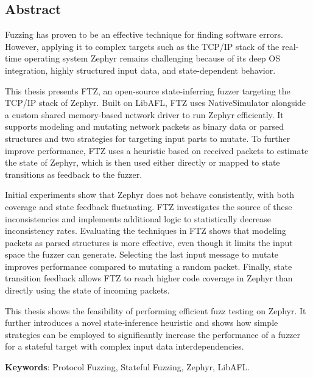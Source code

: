 \documentclass[twocolumn]{article}
\newcommand{\proj}{FTZ\xspace}
\begin{document}
\begin{center}
  \begin{minipage}{0.7\textwidth}
    \vspace{100px}
    \begin{center}
      \section*{Abstract}
    \end{center}
    \vspace{3ex}

    \setlength{\parindent}{1.5em}

    Fuzzing has proven to be an effective technique for finding software errors. However, applying it to complex targets such as the TCP/IP stack of the real-time operating system Zephyr remains challenging because of its deep OS integration, highly structured input data, and state-dependent behavior.

    This thesis presents \proj, an open-source state-inferring fuzzer targeting the TCP/IP stack of Zephyr. Built on LibAFL, \proj uses NativeSimulator alongside a custom shared memory-based network driver to run Zephyr efficiently. It supports modeling and mutating network packets as binary data or parsed structures and two strategies for targeting input parts to mutate. To further improve performance, \proj uses a heuristic based on received packets to estimate the state of Zephyr, which is then used either directly or mapped to state transitions as feedback to the fuzzer.

    Initial experiments show that Zephyr does not behave consistently, with both coverage and state feedback fluctuating. \proj investigates the source of these inconsistencies and implements additional logic to statistically decrease inconsistency rates. Evaluating the techniques in \proj shows that modeling packets as parsed structures is more effective, even though it limits the input space the fuzzer can generate. Selecting the last input message to mutate improves performance compared to mutating a random packet. Finally, state transition feedback allows \proj to reach higher code coverage in Zephyr than directly using the state of incoming packets.

    This thesis shows the feasibility of performing efficient fuzz testing on Zephyr. It further introduces a novel state-inference heuristic and shows how simple strategies can be employed to significantly increase the performance of a fuzzer for a stateful target with complex input data interdependencies.
    \vspace{70px}

    \textbf{Keywords}: Protocol Fuzzing, Stateful Fuzzing, Zephyr, LibAFL.
  \end{minipage}
\end{center}
\end{document}
